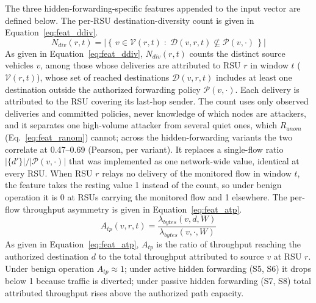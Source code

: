 \documentclass[12pt, a4paper]{report}
\begin{document}
The three hidden-forwarding-specific features appended
to the input vector are defined below. The per-\ac{RSU}
destination-diversity count is given in
Equation~\eqref{eq:feat_ddiv}.
\begin{equation}
N_{div}(r,t) =
\left|\left\{\,
v \in \mathcal{V}(r,t) \;:\;
\mathcal{D}(v,r,t) \not\subseteq \mathcal{P}(v,\cdot)
\,\right\}\right|
\label{eq:feat_ddiv}
\end{equation}
As given in Equation~\eqref{eq:feat_ddiv},
$N_{div}(r,t)$ counts the distinct source vehicles $v$,
among those whose deliveries are attributed to \ac{RSU} $r$
in window $t$ ($\mathcal{V}(r,t)$), whose set of reached
destinations $\mathcal{D}(v,r,t)$ includes at least one
destination outside the authorized forwarding policy
$\mathcal{P}(v,\cdot)$. Each delivery is attributed to the
\ac{RSU} covering its last-hop sender. The count uses only
observed deliveries and committed policies, never knowledge
of which nodes are attackers, and it separates one
high-volume attacker from several quiet ones, which
$R_{anom}$ (Eq.~\ref{eq:feat_ranom}) cannot; across the
hidden-forwarding variants the two correlate at
0.47--0.69 (Pearson, per variant). It replaces a single-flow ratio
$|\{d'\}|/|\mathcal{P}(v,\cdot)|$ that was implemented as one
network-wide value, identical at every \ac{RSU}. When
\ac{RSU} $r$ relays no delivery of the monitored flow in
window $t$, the feature takes the resting value 1 instead
of the count, so under benign operation it is 0 at
\ac{RSU}s carrying the monitored flow and 1 elsewhere. The per-flow
throughput asymmetry is given in
Equation~\eqref{eq:feat_atp}.
\begin{equation}
A_{tp}(v,r,t) =
\frac{\lambda_{bytes}(v,d,W)}
{\lambda_{bytes}(v,\cdot,W)}
\label{eq:feat_atp}
\end{equation}
As given in Equation~\eqref{eq:feat_atp},
$A_{tp}$ is the ratio of throughput reaching the
authorized destination $d$ to the total throughput
attributed to source $v$ at \ac{RSU} $r$. Under
benign operation $A_{tp}{\approx}1$; under active
hidden forwarding (S5, S6) it drops below 1 because
traffic is diverted; under passive hidden forwarding
(S7, S8) total attributed throughput rises above the
authorized path capacity.
\end{document}
